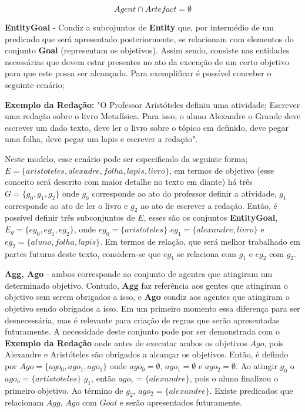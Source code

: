 \begin{equation} \label{agentsartefactvoid}
    Agent \cap Artefact = \emptyset
\end{equation}


\textbf{EntityGoal} - Condiz a subcojuntos de \textbf{Entity} que, por intermédio de um predicado que será apresentado posteriormente, se relacionam 
com elementos do conjunto \textbf{Goal} (representam os objetivos). Assim sendo, consiste nas entidades necessárias que devem estar presentes no 
ato da execução de um certo objetivo para que este possa ser alcançado. Para exemplificar é possível conceber o seguinte cenário; 

\textbf{Exemplo da Redação:} "O Professor Aristóteles definiu uma atividade; Escrever uma redação sobre o livro Metafísica. Para isso, o aluno Alexandre o Grande deve escrever um dado texto, deve ler o livro sobre o tópico em definido, deve pegar uma folha, deve pegar um lapis e escrever a redação".  


Neste modelo, esse cenário pode 
ser especificado da seguinte forma; $E = \{aristoteles, alexadre, folha, lapis, livro\}$, em termos de objetivo (esse conceito será descrito com maior detalhe no texto em diante) 
há três $G = \{ g_0, g_1,g_2\}$  onde $g_0$ corresponde ao ato do professor definir a atividade, $g_1$ corresponde ao ato de ler o livro e $g_2$ ao ato de escrever a redação. Então, é possível 
definir três subconjuntos de $E$, esses são os conjuntos \textbf{EntityGoal},
$E_g = \{ eg_{0}, eg_{1}, eg_{2} \}$, onde $eg_{0} = \{ aristoteles \}$ $eg_{1} = \{ alexandre, livro\}$ e $eg_{2} = \{ aluno, folha, lapis \}$. Em termos de relação, que será melhor trabalhado 
em partes futuras deste texto, considera-se que $eg_1$ se relaciona com $g_1$ e $eg_2$ com $g_2$.

\textbf{Agg, Ago} - ambos corresponde ao conjunto de agentes que atingiram um determinado objetivo. Contudo, \textbf{Agg} faz referência aos gentes que 
atingiram o objetivo sem serem obrigados a isso, e \textbf{Ago} condiz aos agentes que atingiram o objetivo sendo obrigados a isso. Em um primeiro momento
essa diferença para ser desnecessária, mas é relevante para criação de regras que serão apresentadas futuramente. A necessidade deste conjunto pode 
por ser demonstrada com o \textbf{Exemplo da Redação} onde antes de executar ambos os objetivos $Ago$, pois Alexandre e Aristóteles são obrigados a alcançar os objetivos. Então, é defindo por $Ago = \{ ago_0, ago_1, ago_1 \}$ onde $ago_0 = \emptyset$, $ago_1 = \emptyset$ e $ago_2 = \emptyset$. Ao atingir $g_0$ o $ago_o = \{ artistoteles\}$ $g_1$, então $ago_1 = \{ alexandre \}$, pois o aluno finalizou 
o primeiro objetivo. Ao término de $g_2$, $ago_2 = \{ alexandre \}$. Existe predicados que relacionam $Agg$, $Ago$ com $Goal$ e serão apresentados futuramente.


